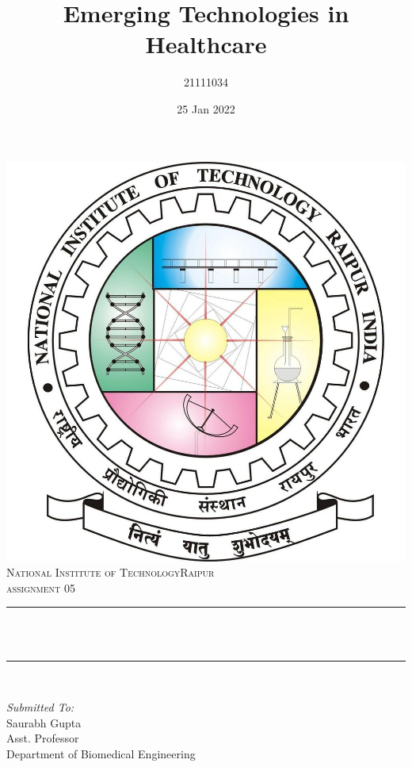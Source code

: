 \documentclass[12pt]{article}
\title{Emerging Technologies in Healthcare}								%
\author{21111034}								%
\date{25 Jan 2022}											%
\makeatletter
\let\thetitle\@title
\makeatother
\begin{document}

\begin{titlepage}
	\centering
    \vspace*{0.5 cm}
    \includegraphics[scale = 0.20]{logo.jpeg}\\[1.0 cm]	%
    \textsc{\LARGE  National Institute of Technology\newline\newline Raipur}\\[2.0 cm]	%
	\textsc{\Large assignment 05}\\[0.5 cm]				%
	\rule{\linewidth}{0.2 mm} \\[0.4 cm]
	{ \huge \bfseries \thetitle}\\
	\rule{\linewidth}{0.2 mm} \\[1.0 cm]
	
	\begin{minipage}{0.4\textwidth}
		\begin{flushleft} \large
			\emph{Submitted To:}\\
			Saurabh Gupta\\
            Asst. Professor\\
            Department of Biomedical Engineering\\
			\end{flushleft}
			\end{minipage}~
			\begin{minipage}{0.4\textwidth}
            

\end{minipage}
\end{titlepage}
\end{document}
